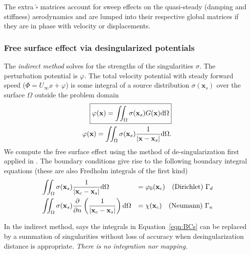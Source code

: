 \documentclass[10pt]{article}
\newcommand{\pp}[2]{\frac{\partial #1}{\partial #2}}
\newcommand{\mbf}[1]{\mathbf{#1}}
\newcommand{\be}{\begin{eqnarray}}
\newcommand{\ee}{\end{eqnarray}}
\newcommand{\beq}{\begin{equation}
    \begin{aligned}
        }
\newcommand{\eeq}{\end{aligned}
\end{equation}
}
\newcommand{\Uinf}{U_{\infty}}
\newcommand{\tn}[1]{\textnormal{#1}}
\begin{document}
% 
The extra $\hat{\square}$ matrices account for sweep effects on the quasi-steady (damping and stiffness) aerodynamics and are lumped into their respective global matrices if they are in phase with velocity or displacements.

\subsubsection{Free surface effect via desingularized potentials}

The \emph{indirect method} solves for the strengths of the singularities $\sigma$.
The perturbation potential is $\varphi$.
The total velocity potential with steady forward speed ($\Phi = \Uinf x + \varphi $) is some integral of a source distribution $\sigma(\mbf{x}_s)$ over the surface $\Omega$ outside the problem domain
\be
\label{eqn:Indirect}
\boxed{
    \varphi(\mbf{x}) = \iint_\Omega \sigma(\mbf{x}_s) G(\mbf{x}) \tn{d}\Omega
}\\
\varphi(\mbf{x}) = \iint_\Omega \sigma(\mbf{x}_s) \frac{1}{\left| \mbf{x} - \mbf{x}_s \right|} \tn{d}\Omega
.
\ee
We compute the free surface effect using the method of de-singularization first applied in \citet{Cao1991}.
The boundary conditions give rise to the following boundary integral equations (these are also Fredholm integrals of the first kind)
\beq
\label{eqn:BCs}
&
\iint_{\Omega}\sigma(\mbf{x}_s)\frac{1}{\left| \mbf{x}_c - \mbf{x}_s \right| } \tn{d} \Omega & = \varphi_0(\mbf{x}_c) \quad \tn{(Dirichlet) } \Gamma_d
\\
& \iint_{\Omega} \sigma(\mbf{x}_s) \pp{}{n}\left(\frac{1}{\left| \mbf{x}_c - \mbf{x}_s\right|}\right)\tn{d} \Omega & = \chi(\mbf{x}_c) \quad \tn{(Neumann) } \Gamma_n
\eeq
In the indirect method, \citet{Cao1991} says the integrals in Equation~\eqref{eqn:BCs} can be replaced by a summation of singularities without loss of accuracy when desingularization distance is appropriate.
\emph{There is no integration nor mapping.}
\end{document}
